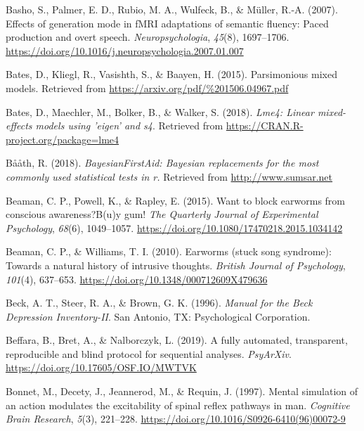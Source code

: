 \documentclass[a4paper,12pt,twoside,onecolumn,openright,final,oldfontcommands]{memoir}
\begin{document}
\leavevmode\hypertarget{ref-basho_effects_2007}{}%
Basho, S., Palmer, E. D., Rubio, M. A., Wulfeck, B., \& Müller, R.-A. (2007). Effects of generation mode in fMRI adaptations of semantic fluency: Paced production and overt speech. \emph{Neuropsychologia}, \emph{45}(8), 1697--1706. \url{https://doi.org/10.1016/j.neuropsychologia.2007.01.007}

\leavevmode\hypertarget{ref-bates_parsimonious_2015}{}%
Bates, D., Kliegl, R., Vasishth, S., \& Baayen, H. (2015). Parsimonious mixed models. Retrieved from \url{https://arxiv.org/pdf/\%201506.04967.pdf}

\leavevmode\hypertarget{ref-R-lme4}{}%
Bates, D., Maechler, M., Bolker, B., \& Walker, S. (2018). \emph{Lme4: Linear mixed-effects models using 'eigen' and s4}. Retrieved from \url{https://CRAN.R-project.org/package=lme4}

\leavevmode\hypertarget{ref-R-BayesianFirstAid}{}%
Bååth, R. (2018). \emph{BayesianFirstAid: Bayesian replacements for the most commonly used statistical tests in r.} Retrieved from \url{http://www.sumsar.net}

\leavevmode\hypertarget{ref-Beaman2015}{}%
Beaman, C. P., Powell, K., \& Rapley, E. (2015). Want to block earworms from conscious awareness?B(u)y gum! \emph{The Quarterly Journal of Experimental Psychology}, \emph{68}(6), 1049--1057. \url{https://doi.org/10.1080/17470218.2015.1034142}

\leavevmode\hypertarget{ref-Beaman2010}{}%
Beaman, C. P., \& Williams, T. I. (2010). Earworms (stuck song syndrome): Towards a natural history of intrusive thoughts. \emph{British Journal of Psychology}, \emph{101}(4), 637--653. \url{https://doi.org/10.1348/000712609X479636}

\leavevmode\hypertarget{ref-beck_manual_1996}{}%
Beck, A. T., Steer, R. A., \& Brown, G. K. (1996). \emph{Manual for the Beck Depression Inventory-II}. San Antonio, TX: Psychological Corporation.

\leavevmode\hypertarget{ref-beffara_fully_2019}{}%
Beffara, B., Bret, A., \& Nalborczyk, L. (2019). A fully automated, transparent, reproducible and blind protocol for sequential analyses. \emph{PsyArXiv}. \url{https://doi.org/10.17605/OSF.IO/MWTVK}

\leavevmode\hypertarget{ref-bonnet_mental_1997}{}%
Bonnet, M., Decety, J., Jeannerod, M., \& Requin, J. (1997). Mental simulation of an action modulates the excitability of spinal reflex pathways in man. \emph{Cognitive Brain Research}, \emph{5}(3), 221--228. \url{https://doi.org/10.1016/S0926-6410(96)00072-9}
\end{document}
